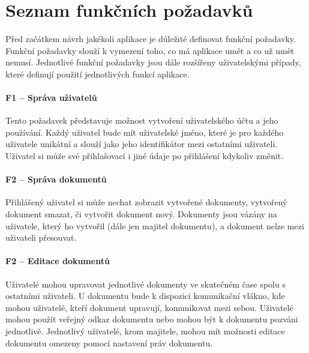 
\section{Seznam funkčních požadavků}\label{sec:seznamFunkčníchPožadavků}

Před začátkem návrh jakékoli aplikace je důležité definovat funkční požadavky.
Funkční požadavky slouží k vymezení toho, co má aplikace umět a co už umět nemusí.
Jednotlivé funkční požadavky jsou dále rozšířeny uživatelskými případy, které definují použití jednotlivých funkcí aplikace.


\paragraph{F1 -- Správa uživatelů}

Tento požadavek představuje možnost vytvoření uživatelského účtu a jeho používání.
Každý uživatel bude mít uživatelské jméno, které je pro každého uživatele unikátní a slouží jako jeho identifikátor mezi ostatními uživateli.
Uživatel si může své přihlašovací i jiné údaje po přihlášení kdykoliv změnit.

\paragraph{F2 -- Správa dokumentů}

Přihlášený uživatel si může nechat zobrazit vytvořené dokumenty, vytvořený dokument smazat, či vytvořit dokument nový.
Dokumenty jsou vázány na uživatele, který ho vytvořil (dále jen majitel dokumentu), a dokument nelze mezi uživateli přesouvat.

\paragraph{F2 -- Editace dokumentů}

Uživatelé mohou upravovat jednotlivé dokumenty ve skutečném čase spolu s ostatními uživateli.
U dokumentu bude k dispozici komunikační vlákno, kde mohou uživatelé, kteří dokument upravují, komunikovat mezi sebou.
Uživatelé mohou použít veřejný odkaz dokumentu nebo mohou být k dokumentu pozváni jednotlivě.
Jednotlivý uživatelé, krom majitele, mohou mít možnosti editace dokumentu omezeny pomocí nastavení práv dokumentu.
